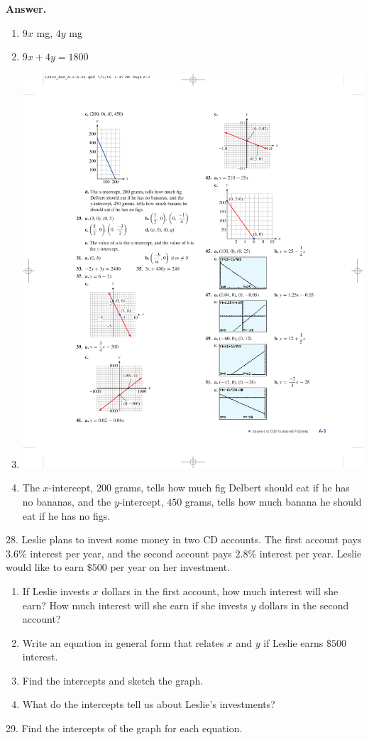 \documentclass[10pt,]{book}
\theoremstyle{plain}
\theoremstyle{definition}
\theoremstyle{definition}
\theoremstyle{definition}
\theoremstyle{definition}
\numberwithin{equation}{part}
\begin{document}
\begin{exerciselist}
\noindent\textbf{Answer.}\hypertarget{answer-21}{}\quad
\leavevmode%
\begin{enumerate}[label=\alph*]
\item\hypertarget{li-204}{}\(9x\) mg, \(4y\) mg%
\item\hypertarget{li-205}{}\(9x + 4y = 1800\)%
\item\hypertarget{li-206}{}\includegraphics[width=0.35\linewidth]{images/fig-ans-1-1-27}
%
\item\hypertarget{li-207}{}The \(x\)-intercept, \(200\) grams, tells how much fig Delbert should eat if he has no bananas, and the \(y\)-intercept, \(450\) grams, tells how much banana he should eat if he has no figs.%
\end{enumerate}
%
\item[28.]\hypertarget{exercise-35}{}Leslie plans to invest some money in two CD accounts. The first account pays \(3.6\%\) interest per year, and the second account pays \(2.8\%\) interest per year. Leslie would like to earn \(\$500\) per year on her investment.%
\leavevmode%
\begin{enumerate}[label=\alph*]
\item\hypertarget{li-208}{}If Leslie invests \(x\) dollars in the first account, how much interest will she earn? How much interest will she earn if she invests \(y\) dollars in the second account?%
\item\hypertarget{li-209}{}Write an equation in general form that relates \(x\) and \(y\) if Leslie earns \(\$500\) interest.%
\item\hypertarget{li-210}{}Find the intercepts and sketch the graph.%
\item\hypertarget{li-211}{}What do the intercepts tell us about Leslie's investments?%
\end{enumerate}
\par\smallskip
\item[29.]\hypertarget{exercise-36}{}Find the intercepts of the graph for each equation.%
\leavevmode%
\begin{multicols}{2}

\end{multicols}
\end{exerciselist}
\end{document}
